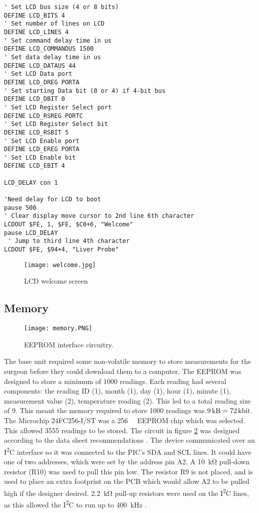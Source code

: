 \begin{lstlisting}
' Set LCD bus size (4 or 8 bits)
DEFINE LCD_BITS 4
' Set number of lines on LCD
DEFINE LCD_LINES 4
' Set command delay time in us
DEFINE LCD_COMMANDUS 1500
' Set data delay time in us
DEFINE LCD_DATAUS 44
' Set LCD Data port
DEFINE LCD_DREG PORTA
' Set starting Data bit (0 or 4) if 4-bit bus
DEFINE LCD_DBIT 0
' Set LCD Register Select port
DEFINE LCD_RSREG PORTC
' Set LCD Register Select bit
DEFINE LCD_RSBIT 5
' Set LCD Enable port
DEFINE LCD_EREG PORTA
' Set LCD Enable bit
DEFINE LCD_EBIT 4

LCD_DELAY con 1

'Need delay for LCD to boot
pause 500            
' Clear display move cursor to 2nd line 6th character
LCDOUT $FE, 1, $FE, $C0+6, "Welcome"         
pause LCD_DELAY
 ' Jump to third line 4th character
LCDOUT $FE, $94+4, "Liver Probe"                
\end{lstlisting}

\begin{figure}[htbp]
	\centering
	\texttt{[image: welcome.jpg]}
	\caption{LCD welcome screen}
	\label{fig: lcd}
\end{figure}





\subsection{Memory}
\begin{figure}[htbp]
	\centering
	\texttt{[image: memory.PNG]}
	\caption{EEPROM interface circuitry.}
	\label{fig: memory schematic}
\end{figure}

The base unit required some non-volatile memory to store measurements for the surgeon before they could download them to a computer. The EEPROM was designed to store a minimum of 1000 readings. Each reading had several components: the reading ID (\SI{1}{\byte}), month (\SI{1}{\byte}), day (\SI{1}{\byte}), hour (\SI{1}{\byte}), minute (\SI{1}{\byte}), measurement value (\SI{2}{\byte}), temperature reading (\SI{2}{\byte}). This led to a total reading size of \SI{9}{\byte}. This meant the memory required to store 1000 readings was $\SI{9}{\kilo\byte}=\SI{72}{\kilo\bit}$. The Microchip 24FC256-I/ST \cite{memory} was a \SI{256}{\kilo\bit} EEPROM chip which was selected. This allowed 3555 readings to be stored. The circuit in figure \ref{fig: memory schematic} was designed according to the data sheet recommendations \cite{memory}. The device communicated over an I\textsuperscript{2}C interface so it was connected to the PIC's SDA and SCL lines. It could have one of two addresses, which were set by the address pin A2. A \SI{10}{\kilo\ohm} pull-down resistor (R10) was used to pull this pin low. The resistor R9 is not placed, and is used to place an extra footprint on the PCB which would allow A2 to be pulled high if the designer desired. \SI{2.2}{\kilo\ohm} pull-up resistors were used on the I\textsuperscript{2}C lines, as this allowed the I\textsuperscript{2}C to run up to \SI{400}{\kilo\hertz} \cite{memory}.\\

